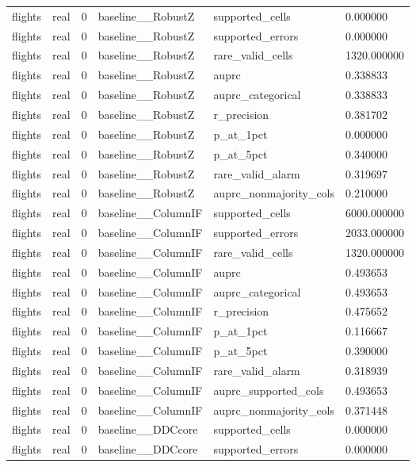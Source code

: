 \begin{tabular}{llllll}
flights & real & 0 & baseline\_\_RobustZ & supported\_cells & 0.000000 \\
flights & real & 0 & baseline\_\_RobustZ & supported\_errors & 0.000000 \\
flights & real & 0 & baseline\_\_RobustZ & rare\_valid\_cells & 1320.000000 \\
flights & real & 0 & baseline\_\_RobustZ & auprc & 0.338833 \\
flights & real & 0 & baseline\_\_RobustZ & auprc\_categorical & 0.338833 \\
flights & real & 0 & baseline\_\_RobustZ & r\_precision & 0.381702 \\
flights & real & 0 & baseline\_\_RobustZ & p\_at\_1pct & 0.000000 \\
flights & real & 0 & baseline\_\_RobustZ & p\_at\_5pct & 0.340000 \\
flights & real & 0 & baseline\_\_RobustZ & rare\_valid\_alarm & 0.319697 \\
flights & real & 0 & baseline\_\_RobustZ & auprc\_nonmajority\_cols & 0.210000 \\
flights & real & 0 & baseline\_\_ColumnIF & supported\_cells & 6000.000000 \\
flights & real & 0 & baseline\_\_ColumnIF & supported\_errors & 2033.000000 \\
flights & real & 0 & baseline\_\_ColumnIF & rare\_valid\_cells & 1320.000000 \\
flights & real & 0 & baseline\_\_ColumnIF & auprc & 0.493653 \\
flights & real & 0 & baseline\_\_ColumnIF & auprc\_categorical & 0.493653 \\
flights & real & 0 & baseline\_\_ColumnIF & r\_precision & 0.475652 \\
flights & real & 0 & baseline\_\_ColumnIF & p\_at\_1pct & 0.116667 \\
flights & real & 0 & baseline\_\_ColumnIF & p\_at\_5pct & 0.390000 \\
flights & real & 0 & baseline\_\_ColumnIF & rare\_valid\_alarm & 0.318939 \\
flights & real & 0 & baseline\_\_ColumnIF & auprc\_supported\_cols & 0.493653 \\
flights & real & 0 & baseline\_\_ColumnIF & auprc\_nonmajority\_cols & 0.371448 \\
flights & real & 0 & baseline\_\_DDCcore & supported\_cells & 0.000000 \\
flights & real & 0 & baseline\_\_DDCcore & supported\_errors & 0.000000 \\

\end{tabular}
